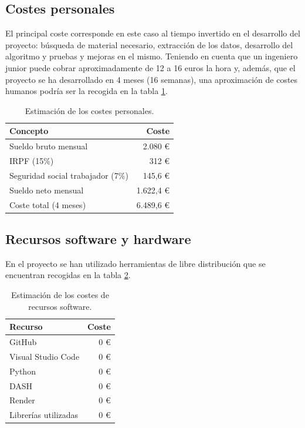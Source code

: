 \subsection*{Costes personales}
El principal coste corresponde en este caso al tiempo invertido en el desarrollo del proyecto: búsqueda de material necesario, extracción de los datos, desarrollo del algoritmo y pruebas y mejoras en el mismo.
Teniendo en cuenta que un ingeniero junior puede cobrar aproximadamente de 12 a 16 euros la hora y, además, que el proyecto se ha desarrollado en 4 meses (16 semanas), una aproximación de costes humanos podría ser la recogida en la tabla \ref{tab:humanos}.

\begin{table}[htbp]
\centering
\caption{Estimación de los costes personales.}
\label{tab:humanos}
\begin{tabular}{lr}
\toprule
\textbf{Concepto} & \textbf{Coste} \\
\midrule
Sueldo bruto mensual & 2.080 € \\
IRPF (15\%) & 312 € \\
Seguridad social trabajador (7\%) & 145,6 € \\
Sueldo neto mensual & 1.622,4  € \\
Coste total (4 meses) & 6.489,6 € \\
\bottomrule
\end{tabular}
\end{table}


\subsection*{Recursos software y hardware}
En el proyecto se han utilizado herramientas de libre distribución que se encuentran recogidas en la tabla \ref{tab:software}. 

\begin{table}[htbp]
\centering
\caption{Estimación de los costes de recursos software.}
\label{tab:software}
\begin{tabular}{lr}
\toprule
\textbf{Recurso} & \textbf{Coste} \\
\midrule
GitHub & 0 € \\
Visual Studio Code & 0 € \\
Python & 0 € \\
DASH & 0 € \\
Render & 0 € \\
Librerías utilizadas & 0 € \\
\bottomrule
\end{tabular}
\end{table}

